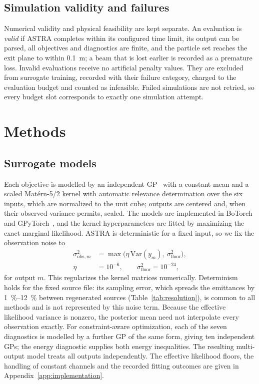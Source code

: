 \documentclass[aps,prab,reprint,superscriptaddress,amsmath,amssymb,floatfix]{revtex4-2}
\begin{document}
\subsection{Simulation validity and failures}
\label{sec:failures}
Numerical validity and physical feasibility are kept separate. An evaluation is \emph{valid} if
ASTRA completes within its configured time limit, its output can be parsed, all objectives and
diagnostics are finite, and the particle set reaches the exit plane to within \SI{0.1}{\metre}; a beam that
is lost earlier is recorded as a premature loss. Invalid evaluations receive no artificial penalty
values. They are excluded from surrogate
training, recorded with their failure category, charged to the evaluation budget and counted as
infeasible. Failed simulations are not
retried, so every budget slot corresponds to exactly one simulation attempt.

\section{Methods}
\label{sec:methods}

\subsection{Surrogate models}
Each objective is modelled by an independent GP~\cite{Rasmussen2006} with a constant mean and a
scaled Mat\'ern-5/2 kernel with automatic relevance determination over the six inputs, which are
normalized to the unit cube; outputs are centered and, when their observed variance permits, scaled.
The models are implemented in
BoTorch~\cite{Balandat2020} and GPyTorch~\cite{Gardner2018}, and the kernel hyperparameters are
fitted by maximizing the exact marginal likelihood. ASTRA is deterministic for a fixed input, so we
fix the observation noise to
\begin{equation}
\begin{aligned}
  \sigma^2_{\mathrm{obs},m} &= \max\bigl(\eta\,\mathrm{Var}(y_m),\ \sigma^2_\mathrm{floor}\bigr),\\
  \eta &= 10^{-6},\qquad \sigma^2_\mathrm{floor} = 10^{-24},
\end{aligned}
\end{equation}
for output $m$. This regularizes the kernel matrices numerically. Determinism holds for the
fixed source file: its sampling error, which spreads the emittances by
\SIrange{1}{12}{\percent} between regenerated sources (Table~\ref{tab:resolution}), is common
to all methods and is not represented by this noise term. Because the effective
likelihood variance is nonzero, the posterior mean need not interpolate every observation
exactly. For constraint-aware optimization, each of the seven diagnostics is modelled by a
further GP of the same form, giving ten independent GPs; the energy diagnostic supplies both
energy inequalities. The resulting multi-output model treats all outputs independently. The
effective likelihood floors, the handling of constant channels and the recorded
fitting outcomes are given in Appendix~\ref{app:implementation}.
\end{document}
